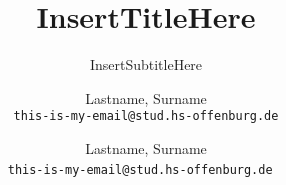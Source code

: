 \newcommand{\myAuthor}{InsertShortAuthorHere}
\author{
	Lastname, Surname\\
	\texttt{this-is-my-email@stud.hs-offenburg.de}
	\and
	Lastname, Surname\\
	\texttt{this-is-my-email@stud.hs-offenburg.de}
	\ \\\\
}
\newcommand{\myTitle}{InsertTitleHere}
\title{\myTitle}
\subtitle{InsertSubtitleHere}
\newcommand{\myCourse}{UNITS X}
\newcommand{\myProject}{InsertProjecthere}
\newcommand{\myUniversity}{Hochschule Offenburg}
\newcommand{\myInstitutehead}{University of Applied Sciences}
\newcommand{\mySupervisor}{InsertProfHere}
\newcommand{\myKeywords}{Keyword1, Keyword2}

